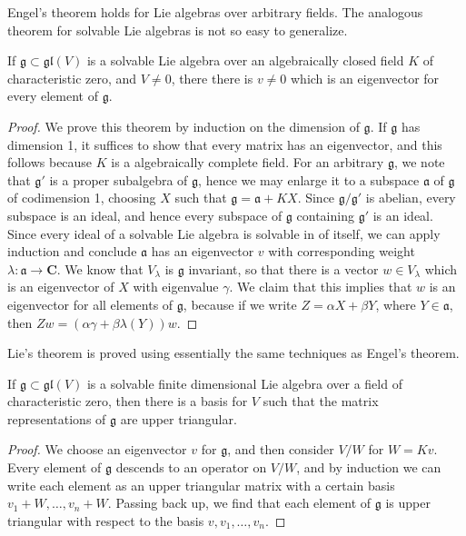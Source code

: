 Engel's theorem holds for Lie algebras over arbitrary fields. The analogous theorem for solvable Lie algebras is not so easy to generalize.

\begin{lemma}
    If $\mathfrak{g} \subset \mathfrak{gl}(V)$ is a solvable Lie algebra over an algebraically closed field $K$ of characteristic zero, and $V \neq 0$, there there is $v \neq 0$ which is an eigenvector for every element of $\mathfrak{g}$.
\end{lemma}
\begin{proof}
    We prove this theorem by induction on the dimension of $\mathfrak{g}$. If $\mathfrak{g}$ has dimension 1, it suffices to show that every matrix has an eigenvector, and this follows because $K$ is a algebraically complete field. For an arbitrary $\mathfrak{g}$, we note that $\mathfrak{g}'$ is a proper subalgebra of $\mathfrak{g}$, hence we may enlarge it to a subspace $\mathfrak{a}$ of $\mathfrak{g}$ of codimension 1, choosing $X$ such that $\mathfrak{g} = \mathfrak{a} + K X$. Since $\mathfrak{g}/\mathfrak{g}'$ is abelian, every subspace is an ideal, and hence every subspace of $\mathfrak{g}$ containing $\mathfrak{g}'$ is an ideal. Since every ideal of a solvable Lie algebra is solvable in of itself, we can apply induction and conclude $\mathfrak{a}$ has an eigenvector $v$ with corresponding weight $\lambda: \mathfrak{a} \to \mathbf{C}$. We know that $V_\lambda$ is $\mathfrak{g}$ invariant, so that there is a vector $w \in V_\lambda$ which is an eigenvector of $X$ with eigenvalue $\gamma$. We claim that this implies that $w$ is an eigenvector for all elements of $\mathfrak{g}$, because if we write $Z = \alpha X + \beta Y$, where $Y \in \mathfrak{a}$, then $Zw = (\alpha \gamma + \beta \lambda(Y))w$.
\end{proof}

Lie's theorem is proved using essentially the same techniques as Engel's theorem.

\begin{theorem}
    If $\mathfrak{g} \subset \mathfrak{gl}(V)$ is a solvable finite dimensional Lie algebra over a field of characteristic zero, then there is a basis for $V$ such that the matrix representations of $\mathfrak{g}$ are upper triangular.
\end{theorem}
\begin{proof}
    We choose an eigenvector $v$ for $\mathfrak{g}$, and then consider $V/W$ for $W = Kv$. Every element of $\mathfrak{g}$ descends to an operator on $V/W$, and by induction we can write each element as an upper triangular matrix with a certain basis $v_1 + W, \dots, v_n + W$. Passing back up, we find that each element of $\mathfrak{g}$ is upper triangular with respect to the basis $v, v_1, \dots, v_n$.
\end{proof}

